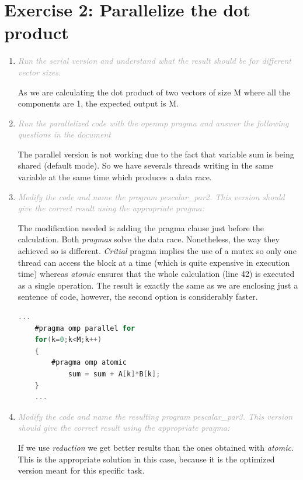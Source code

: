\documentclass{article}
\newcommand{\greyItem}[1]{\item\emph{\textcolor{darkgray}{#1}}}
\begin{document}
\section{Exercise 2: Parallelize the dot product}

\begin{enumerate}[label=2.\arabic*,leftmargin=*]

\greyItem{Run the serial version and understand what the result should be for different vector sizes.} 
    
As we are calculating the dot product of two vectors of size M where all the components are 1, the expected output is M.
    
\greyItem{Run the parallelized code with the openmp pragma and answer the following questions in the document}
    
The parallel version is not working due to the fact that variable sum is being shared (default mode). So we have severals threads writing in the same variable at the same time which produces a data race.

\greyItem{Modify the code and name the program pescalar\_par2. This version should give the correct result using the appropriate pragma:}

The modification needed is adding the pragma clause just before the calculation.
Both \emph{pragmas} solve the data race. Nonetheless, the way they achieved so is different. \emph{Critial} pragma implies the use of a mutex so only one thread can access the block at a time (which is quite expensive in execution time) whereas \emph{atomic} ensures that the whole calculation (line 42) is executed as a single operation. The result is exactly the same as we are enclosing just a sentence of code, however, the second option is considerably faster.

\begin{lstlisting}[language=C, texcl=true]
    ...
    #pragma omp parallel for 
    for(k=0;k<M;k++)
    {	
        #pragma omp atomic
            sum = sum + A[k]*B[k];
    } 
    ...
\end{lstlisting}

\greyItem{Modify the code and name the resulting program pescalar\_par3. This version should give the correct result using the appropriate pragma: }

If we use \emph{reduction} we get better results than the ones obtained with \emph{atomic}. This is the appropriate solution in this case, because it is the optimized version meant for this specific task.


\end{enumerate}
\end{document}
